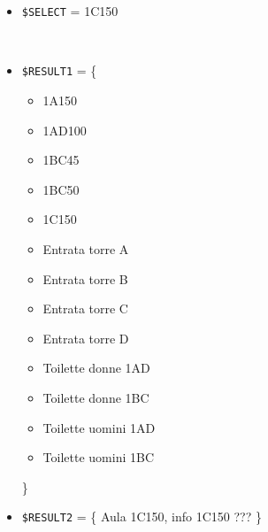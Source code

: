 \documentclass[../../SperimentazioniPratiche.tex]{subfiles}
\begin{document}
			\paragraph*{}
			\label{Prova12A.1}
			\begin{tcolorbox}[fonttitle=\bfseries, 
								adjusted title={\Large Prova 12A.1}, 
								breakable, 
								sharp corners=south,
								colback=white, 
								colframe=white!60!black]
								
				\begin{description}[leftmargin=0.7cm,labelwidth=!]
				
					\item[Input] \ \par 
        				\begin{itemize}
        					\item \verb|$SELECT| = 1C150
        				\end{itemize}
        				
        			\tcbline 
        				
        			\item[Output atteso] \ \par
        				\begin{itemize}
        					\item \verb|$RESULT1| = \{
        					\begin{itemize}
        						\item 1A150
								\item 1AD100
								\item 1BC45
								\item 1BC50
								\item 1C150
								\item Entrata torre A
								\item Entrata torre B
								\item Entrata torre C
								\item Entrata torre D
								\item Toilette donne 1AD
								\item Toilette donne 1BC
								\item Toilette uomini 1AD
								\item Toilette uomini 1BC
        					\end{itemize}
        					\}
        					\item \verb|$RESULT2| = \{
        						Aula 1C150, info 1C150  ???
        					\}
        				\end{itemize}


\end{description}
\end{tcolorbox}
\end{document}
